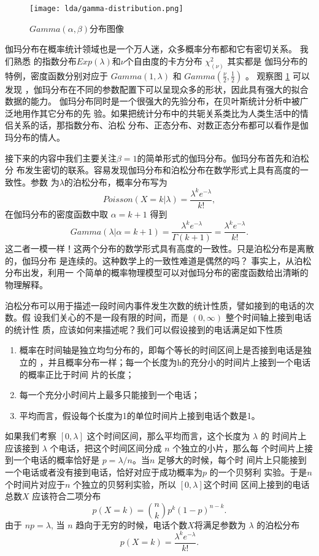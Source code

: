 {\begin{figure}[htbp]
\centering
\texttt{[image: lda/gamma-distribution.png]}
\caption{\label{gamma-distr-graph}$ Gamma(\alpha,\beta)$分布图像}
\end{figure}

伽玛分布在概率统计领域也是一个万人迷，众多概率分布都和它有密切关系。 我们熟悉
的指数分布$Exp(\lambda)$和$\nu$个自由度的卡方分布 $\chi^2_{(\nu)}$ 其实都是
伽玛分布的特例，密度函数分别对应于 $Gamma(1, \lambda)$ 和
$Gamma(\frac{\nu}{2}, \frac{1}{2})$ 。 观察图 \ref{gamma-distr-graph} 可以发现
，伽玛分布在不同的参数配置下可以呈现众多的形状，因此具有强大的拟合数据的能力。
伽玛分布同时是一个很强大的先验分布，在贝叶斯统计分析中被广泛地用作其它分布的先
验。如果把统计分布中的共轭关系类比为人类生活中的情侣关系的话，那指数分布、泊松
分布、正态分布、对数正态分布都可以看作是伽玛分布的情人。

接下来的内容中我们主要关注$\beta = 1$的简单形式的伽玛分布。伽玛分布首先和泊松分
布发生密切的联系。容易发现伽玛分布和泊松分布在数学形式上具有高度的一致性。参数
为$\lambda$的泊松分布，概率分布写为
$$Poisson(X=k|\lambda) = \frac{\lambda^k e^{-\lambda}}{k!} , $$
在伽玛分布的密度函数中取 $\alpha = k+1$ 得到
$$ Gamma(\lambda|\alpha=k+1) 
= \frac{\lambda^ke^{-\lambda}}{\Gamma(k+1)}= \frac{\lambda^k e^{-\lambda}}{k!} . $$
这二者一模一样！这两个分布的数学形式具有高度的一致性。只是泊松分布是离散的，伽玛分布
是连续的。这种数学上的一致性难道是偶然的吗？ 事实上，从泊松分布出发，利用一
个简单的概率物理模型可以对伽玛分布的密度函数给出清晰的物理解释。

泊松分布可以用于描述一段时间内事件发生次数的统计性质，譬如接到的电话的次数。假
设我们关心的不是一段有限的时间，而是 $(0, \infty)$ 整个时间轴上接到电话的统计性
质，应该如何来描述呢？我们可以假设接到的电话满足如下性质
\begin{enumerate}
\item 概率在时间轴是独立均匀分布的，即每个等长的时间区间上是否接到电话是独立的
，并且概率分布一样；每一个长度为h的充分小的时间片上接到一个电话的概率正比于时间
片的长度；
\item 每一个充分小时间片上最多只能接到一个电话；
\item 平均而言，假设每个长度为1的单位时间片上接到电话个数是1。
\end{enumerate}
如果我们考察 $[0, \lambda]$ 这个时间区间，那么平均而言，这个长度为 $\lambda$ 的
时间片上应该接到 $\lambda$ 个电话，把这个时间区间分成 $n$ 个独立的小片，那么每
个时间片上接到一个电话的概率恰好是 $p = \lambda/n$。当$n$ 足够大的时候，每个时
间片上只能接到一个电话或者没有接到电话，恰好对应于成功概率为$p$ 的一个贝努利
实验。于是$n$ 个时间片对应于$n$ 个独立的贝努利实验，所以 $[0, \lambda]$这个时间
区间上接到的电话总数$X$ 应该符合二项分布
$$p(X=k) = \binom{n}{k} p^k(1-p)^{n-k} .$$
由于 $np= \lambda$, 当 $n$ 趋向于无穷的时候，电话个数$X$将满足参数为
$\lambda$ 的泊松分布
$$p(X=k) = \frac{\lambda^k e^{-\lambda}}{k!} .$$

}
